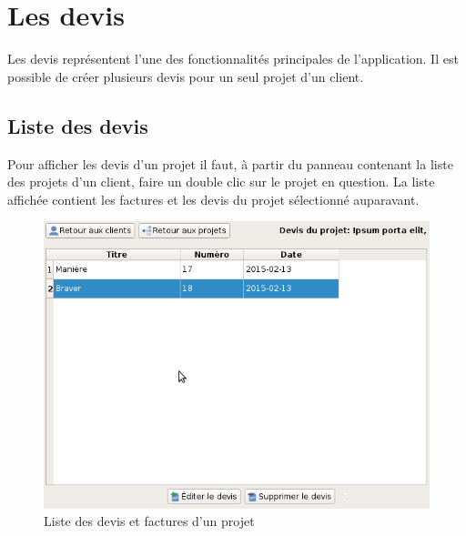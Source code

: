 \chapter{Les devis}
Les devis représentent l'une des fonctionnalités principales de l'application. Il est possible de créer plusieurs devis pour un seul projet d'un client. 
\section{Liste des devis}
Pour afficher les devis d'un projet il faut, à partir du panneau contenant la liste des projets d'un client, faire un double clic sur le projet en question. La liste affichée contient les factures et les devis du projet sélectionné auparavant.
\begin{figure}[H]
	\centering
	\includegraphics[width=12cm]{screens/ihmDevis.png}
	\caption{Liste des devis et factures d'un projet}
\end{figure}

